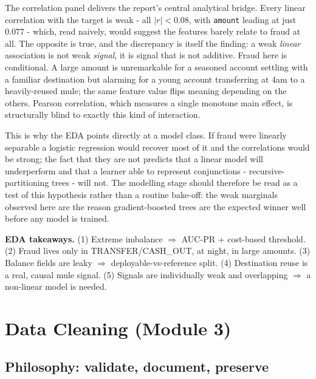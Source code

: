 \documentclass[11pt,a4paper]{report}
\newcommand{\code}[1]{\texttt{\small #1}}
\begin{document}
The correlation panel delivers the report's central analytical bridge. Every linear correlation with the target is weak - all $|r|<0.08$, with \code{amount} leading at just $0.077$ - which, read naively, would suggest the features barely relate to fraud at all. The opposite is true, and the discrepancy is itself the finding: a weak \emph{linear} association is not weak \emph{signal}, it is signal that is not additive. Fraud here is conditional. A large amount is unremarkable for a seasoned account settling with a familiar destination but alarming for a young account transferring at 4am to a heavily-reused mule; the same feature value flips meaning depending on the others. Pearson correlation, which measures a single monotone main effect, is structurally blind to exactly this kind of interaction.

This is why the EDA points directly at a model class. If fraud were linearly separable a logistic regression would recover most of it and the correlations would be strong; the fact that they are not predicts that a linear model will underperform and that a learner able to represent conjunctions - recursive-partitioning trees - will not. The modelling stage should therefore be read as a test of this hypothesis rather than a routine bake-off: the weak marginals observed here are the reason gradient-boosted trees are the expected winner well before any model is trained.

\begin{keybox}
\textbf{EDA takeaways.} (1) Extreme imbalance $\Rightarrow$ AUC-PR + cost-based threshold.
(2) Fraud lives only in TRANSFER/CASH\_OUT, at night, in large amounts.
(3) Balance fields are leaky $\Rightarrow$ deployable-vs-reference split.
(4) Destination reuse is a real, causal mule signal.
(5) Signals are individually weak and overlapping $\Rightarrow$ a non-linear model is needed.
\end{keybox}

\chapter{Data Cleaning (Module 3)}
\label{ch:m3}

\section{Philosophy: validate, document, preserve}
\end{document}
